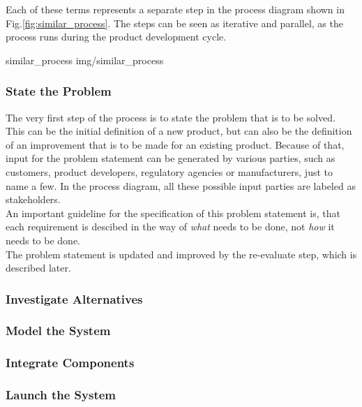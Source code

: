 Each of these terms represents a separate step in the process diagram shown in Fig.\ref{fig:similar_process}.
The steps can be seen as iterative and parallel, as the process runs during the product development cycle.

 {similar_process} {img/similar_process}

\subsubsection{State the Problem}

The very first step of the process is to state the problem that is to be solved.
This can be the initial definition of a new product, but can also be the definition of an improvement that is to be made for an existing product.
Because of that, input for the problem statement can be generated by various parties, such as customers, product developers, regulatory agencies or manufacturers, just to name a few.
In the process diagram, all these possible input parties are labeled as stakeholders.\\

An important guideline for the specification of this problem statement is, that each requirement is descibed in the way of \textit{what} needs to be done, not \textit{how} it needs to be done.\\

The problem statement is updated and improved by the re-evaluate step, which is described later.

\subsubsection{Investigate Alternatives}



\subsubsection{Model the System}

\subsubsection{Integrate Components}

\subsubsection{Launch the System}

